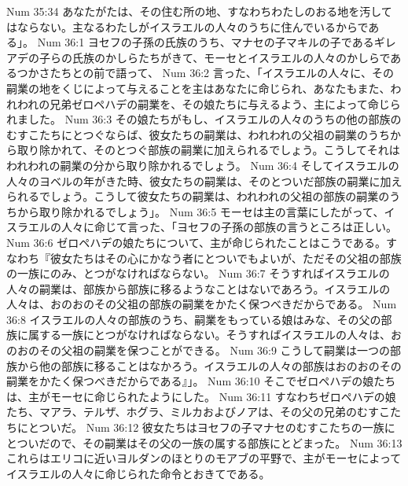 Num 35:34  あなたがたは、その住む所の地、すなわちわたしのおる地を汚してはならない。主なるわたしがイスラエルの人々のうちに住んでいるからである」。
Num 36:1  ヨセフの子孫の氏族のうち、マナセの子マキルの子であるギレアデの子らの氏族のかしらたちがきて、モーセとイスラエルの人々のかしらであるつかさたちとの前で語って、
Num 36:2  言った、「イスラエルの人々に、その嗣業の地をくじによって与えることを主はあなたに命じられ、あなたもまた、われわれの兄弟ゼロペハデの嗣業を、その娘たちに与えるよう、主によって命じられました。
Num 36:3  その娘たちがもし、イスラエルの人々のうちの他の部族のむすこたちにとつぐならば、彼女たちの嗣業は、われわれの父祖の嗣業のうちから取り除かれて、そのとつぐ部族の嗣業に加えられるでしょう。こうしてそれはわれわれの嗣業の分から取り除かれるでしょう。
Num 36:4  そしてイスラエルの人々のヨベルの年がきた時、彼女たちの嗣業は、そのとついだ部族の嗣業に加えられるでしょう。こうして彼女たちの嗣業は、われわれの父祖の部族の嗣業のうちから取り除かれるでしょう」。
Num 36:5  モーセは主の言葉にしたがって、イスラエルの人々に命じて言った、「ヨセフの子孫の部族の言うところは正しい。
Num 36:6  ゼロペハデの娘たちについて、主が命じられたことはこうである。すなわち『彼女たちはその心にかなう者にとついでもよいが、ただその父祖の部族の一族にのみ、とつがなければならない。
Num 36:7  そうすればイスラエルの人々の嗣業は、部族から部族に移るようなことはないであろう。イスラエルの人々は、おのおのその父祖の部族の嗣業をかたく保つべきだからである。
Num 36:8  イスラエルの人々の部族のうち、嗣業をもっている娘はみな、その父の部族に属する一族にとつがなければならない。そうすればイスラエルの人々は、おのおのその父祖の嗣業を保つことができる。
Num 36:9  こうして嗣業は一つの部族から他の部族に移ることはなかろう。イスラエルの人々の部族はおのおのその嗣業をかたく保つべきだからである』」。
Num 36:10  そこでゼロペハデの娘たちは、主がモーセに命じられたようにした。
Num 36:11  すなわちゼロペハデの娘たち、マアラ、テルザ、ホグラ、ミルカおよびノアは、その父の兄弟のむすこたちにとついだ。
Num 36:12  彼女たちはヨセフの子マナセのむすこたちの一族にとついだので、その嗣業はその父の一族の属する部族にとどまった。
Num 36:13  これらはエリコに近いヨルダンのほとりのモアブの平野で、主がモーセによってイスラエルの人々に命じられた命令とおきてである。


